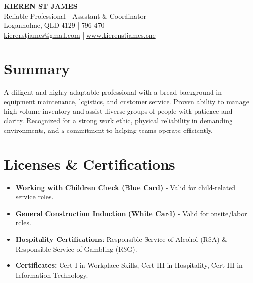 \documentclass[11pt, a4paper]{article}
\begin{document}
\raggedright

\begin{center}
    {\Huge\sffamily \textbf{KIEREN ST JAMES}} \\
    \vspace{2pt}
    {\large\sffamily\color{accent} Reliable Professional | Assistant \& Coordinator} \\
    \vspace{4pt}
    {\sffamily Loganholme, QLD 4129 \quad |  796 470} \\
    {\sffamily \href{mailto:kierenstjames@gmail.com}{kierenstjames@gmail.com} \quad | \quad \href{http://www.kierenstjames.one}{www.kierenstjames.one}}
\end{center}

\section{Summary}
A diligent and highly adaptable professional with a broad background in equipment maintenance, logistics, and customer service. Proven ability to manage high-volume inventory and assist diverse groups of people with patience and clarity. Recognized for a strong work ethic, physical reliability in demanding environments, and a commitment to helping teams operate efficiently. 

\section{Licenses \& Certifications}
\begin{itemize}
    \item \textbf{Working with Children Check (Blue Card)} - Valid for child-related service roles.
    \item \textbf{General Construction Induction (White Card)} - Valid for onsite/labor roles.
    \item \textbf{Hospitality Certifications:} Responsible Service of Alcohol (RSA) \& Responsible Service of Gambling (RSG).
    \item \textbf{Certificates:} Cert I in Workplace Skills, Cert III in Hospitality, Cert III in Information Technology.
\end{itemize}

\end{document}
